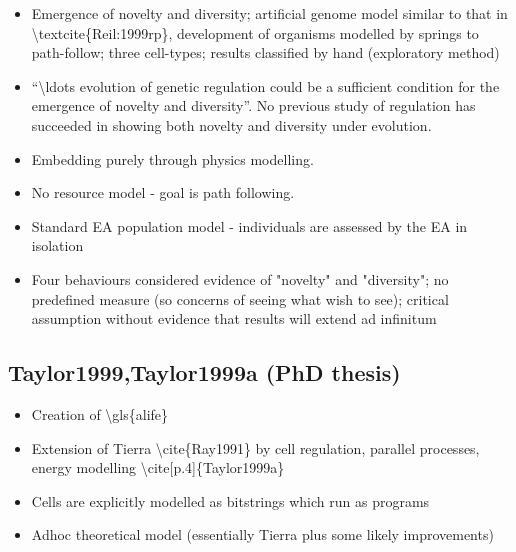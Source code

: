 		\begin{itemize}
			\item
			
			Emergence of novelty and diversity; artificial genome model similar to
			that in \textbackslash{}textcite\{Reil:1999rp\}, development of
			organisms modelled by springs to path-follow; three cell-types;
			results classified by hand (exploratory method)
			
			\item
			
			``\textbackslash{}ldots evolution of genetic regulation could be a
			sufficient condition for the emergence of novelty and diversity''. No
			previous study of regulation has succeeded in showing both novelty and
			diversity under evolution.
			
			\item
			
			Embedding purely through physics modelling.
			
			\item
			
			No resource model - goal is path following.
			
			\item
			
			Standard EA population model - individuals are assessed by the EA in
			isolation
			
			\item
			
			Four behaviours considered evidence of "novelty" and "diversity"; no
			predefined measure (so concerns of seeing what wish to see); critical
			assumption without evidence that results will extend ad infinitum
			
		\end{itemize}
		
		\hypertarget{taylor1999taylor1999a-phd-thesis}{\subsection{Taylor1999,Taylor1999a
				(PhD thesis)}\label{taylor1999taylor1999a-phd-thesis}}
		
		\begin{itemize}
			\item
			
			Creation of \textbackslash{}gls\{alife\}
			
			\item
			
			Extension of Tierra \textbackslash{}cite\{Ray1991\} by cell
			regulation, parallel processes, energy modelling
			\textbackslash{}cite{[}p.4{]}\{Taylor1999a\}
			
			\item
			
			Cells are explicitly modelled as bitstrings which run as programs
			
			\item
			
			Adhoc theoretical model (essentially Tierra plus some likely
			improvements)
			
		\end{itemize}